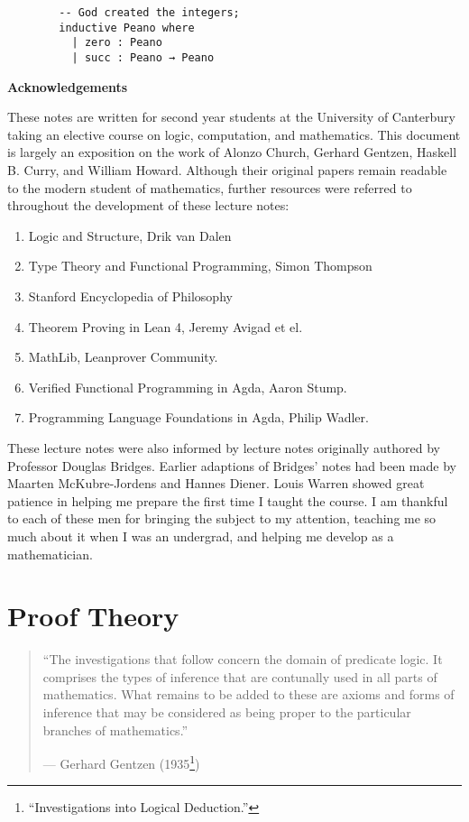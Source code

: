\documentclass{book}
\begin{document}
    \begin{lstlisting}
        -- God created the integers;
        inductive Peano where
          | zero : Peano
          | succ : Peano → Peano
    \end{lstlisting} 
    


    \newpage
    {\bf Acknowledgements} 

    These notes are written for second year students at the University of Canterbury taking an elective course on logic, computation, and mathematics. This document is largely an exposition on the work of Alonzo Church, Gerhard Gentzen, Haskell B. Curry, and William Howard. Although their original papers remain readable to the modern student of mathematics, further resources were referred to throughout the development of these lecture notes:

        \begin{enumerate}
            \item Logic and Structure, Drik van Dalen \cite{vDalen}
            \item Type Theory and Functional Programming, Simon Thompson \cite{thompson}
            \item Stanford Encyclopedia of Philosophy
            \item Theorem Proving in Lean 4, Jeremy Avigad et el.
            \item MathLib, Leanprover Community. 
            \item Verified Functional Programming in Agda, Aaron Stump.
            \item Programming Language Foundations in Agda, Philip Wadler. 
        \end{enumerate}    
    
    These lecture notes were also informed by lecture notes originally authored by Professor Douglas Bridges. Earlier adaptions of Bridges' notes had been made by Maarten McKubre-Jordens and Hannes Diener. Louis Warren showed great patience in helping me prepare the first time I taught the course. I am thankful to each of these men for bringing the subject to my attention, teaching me so much about it when I was an undergrad, and helping me develop as a mathematician. 

\chapter{Proof Theory}

\begin{quote}
    ``The investigations that follow concern the domain of predicate logic. It comprises the types of inference that are contunally used in all parts of mathematics. What remains to be added to these are axioms and forms of inference that may be considered as being proper to the particular branches of mathematics.''
    \begin{flushright}
        --- Gerhard Gentzen (1935\footnote{``Investigations into Logical Deduction.''})
    \end{flushright}
\end{quote}
\end{document}
